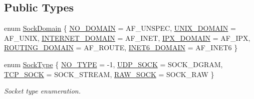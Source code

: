 \subsection*{Public Types}
\begin{DoxyCompactItemize}
\item 
enum \hyperlink{classSocketClass_ac940413abaa7328db8518a9f121babb6}{Sock\+Domain} \{ \newline
\hyperlink{classSocketClass_ac940413abaa7328db8518a9f121babb6aa9ec2a4d642c47813fe90f362603f1c4}{N\+O\+\_\+\+D\+O\+M\+A\+IN} = A\+F\+\_\+\+U\+N\+S\+P\+EC, 
\hyperlink{classSocketClass_ac940413abaa7328db8518a9f121babb6ab92d1dfedf24d12d2b9f58b8d3a85be5}{U\+N\+I\+X\+\_\+\+D\+O\+M\+A\+IN} = A\+F\+\_\+\+U\+N\+IX, 
\hyperlink{classSocketClass_ac940413abaa7328db8518a9f121babb6a2cc4ca83a7b48c990a3454120b6af0b4}{I\+N\+T\+E\+R\+N\+E\+T\+\_\+\+D\+O\+M\+A\+IN} = A\+F\+\_\+\+I\+N\+ET, 
\hyperlink{classSocketClass_ac940413abaa7328db8518a9f121babb6a8b4768bb03b79d7cd9b73eb5e75584d4}{I\+P\+X\+\_\+\+D\+O\+M\+A\+IN} = A\+F\+\_\+\+I\+PX, 
\newline
\hyperlink{classSocketClass_ac940413abaa7328db8518a9f121babb6a531a739bc633378bafd6b248f2d21567}{R\+O\+U\+T\+I\+N\+G\+\_\+\+D\+O\+M\+A\+IN} = A\+F\+\_\+\+R\+O\+U\+TE, 
\hyperlink{classSocketClass_ac940413abaa7328db8518a9f121babb6abe0484126572a8667d5290faba923bf3}{I\+N\+E\+T6\+\_\+\+D\+O\+M\+A\+IN} = A\+F\+\_\+\+I\+N\+E\+T6
 \}
\item 
enum \hyperlink{classSocketClass_a2182dd9fee09459fabb99e6ae717f595}{Sock\+Type} \{ \hyperlink{classSocketClass_a2182dd9fee09459fabb99e6ae717f595a8c7f955ea5b71498ff1d469345d813ad}{N\+O\+\_\+\+T\+Y\+PE} = -\/1, 
\hyperlink{classSocketClass_a2182dd9fee09459fabb99e6ae717f595a804fd19ca5ff4bfaf2564830bb3ea82b}{U\+D\+P\+\_\+\+S\+O\+CK} = S\+O\+C\+K\+\_\+\+D\+G\+R\+AM, 
\hyperlink{classSocketClass_a2182dd9fee09459fabb99e6ae717f595a76163824c40569e670cd455185cf46e9}{T\+C\+P\+\_\+\+S\+O\+CK} = S\+O\+C\+K\+\_\+\+S\+T\+R\+E\+AM, 
\hyperlink{classSocketClass_a2182dd9fee09459fabb99e6ae717f595a2e14668dd087d168ed5f5f837c1b2ff1}{R\+A\+W\+\_\+\+S\+O\+CK} = S\+O\+C\+K\+\_\+\+R\+AW
 \}\begin{DoxyCompactList}\small\item\em Socket type enumeration. \end{DoxyCompactList}
\end{DoxyCompactItemize}
